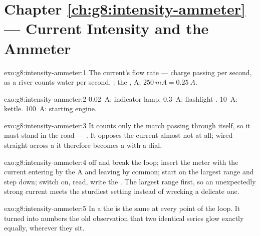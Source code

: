 \section*{Chapter \ref{ch:g8:intensity-ammeter} --- Current Intensity and the Ammeter}

\begin{solution}{exo:g8:intensity-ammeter:1}
The current's flow rate --- charge passing per second, as a
river counts water per second. : the , \unit{A};
$\qty{250}{mA} = \qty{0.25}{A}$.
\end{solution}

\begin{solution}{exo:g8:intensity-ammeter:2}
\qty{0.02}{A}: indicator lamp. \qty{0.3}{A}: flashlight .
\qty{10}{A}: kettle. \qty{100}{A}: starting engine.
\end{solution}

\begin{solution}{exo:g8:intensity-ammeter:3}
It counts only the march passing through itself, so it must
stand in the road --- . It opposes the current almost
not at all; wired straight across a  it therefore becomes
a  with a dial.
\end{solution}

\begin{solution}{exo:g8:intensity-ammeter:4}
 off and break the loop; insert the meter with the current
entering by the \unit{A}  and leaving by common; start
on the largest range and step down; switch on, read, write the
. The largest range first, so an unexpectedly strong current
meets the sturdiest setting instead of wrecking a delicate one.
\end{solution}

\begin{solution}{exo:g8:intensity-ammeter:5}
In a  the  is the same at every point of
the loop. It turned into numbers the old observation that two
identical series  glow exactly equally, wherever they sit.
\end{solution}

